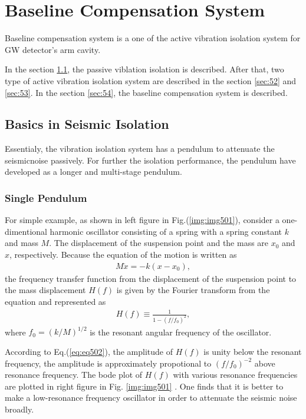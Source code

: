 \chapter{Baseline Compensation System}
Baseline compensation system is a one of the active vibration isolation system for GW detector's arm cavity. 

In the section \cref{sec:51}, the passive viblation isolation is described. After that, two type of active vibration isolation system are described in the section \cref{sec:52} and \cref{sec:53}. In the section \cref{sec:54}, the baseline compensation system is described.

\section{Basics in Seismic Isolation}\label{sec:51}
Essentialy, the vibration isolation system has a pendulum to attenuate the seismicnoise passively. For further the isolation performance, the pendulum have developed as a longer and multi-stage pendulum.

\subsection{Single Pendulum}
For simple example, as shown in left figure in Fig.(\ref{img:img501}), consider a one-dimentional harmonic oscillator consisting of a spring with a spring constant $k$ and mass $M$. The displacement of the suspension point and the mass are $x_0$ and $x$, respectively. Because the equation of the motion is written as
\begin{eqnarray} \label{eq:eq501}
  M\ddot{x} = -k(x-x_0),
\end{eqnarray}
the frequency transfer function from the displacement of the suspension point to the mass displacement $H(f)$ is given by the Fourier transform from the equation and represented as
\begin{eqnarray} \label{eq:eq502}
  H(f) \equiv \frac{1}{1-(f/f_0)^2},
\end{eqnarray}
where $f_0 = (k/M)^{1/2}$ is the resonant angular frequency of the oscillator.

According to Eq.(\ref{eq:eq502}), the amplitude of $H(f)$ is unity below the resonant frequency, the amplitude is approximately propotional to $(f/f_0)^{-2}$ above resonance frequency. The bode plot of $H(f)$ with various resonance frequencies are plotted in right figure in Fig. \ref{img:img501} . One finds that it is better to make a low-resonance frequency oscillator in order to attenuate the seismic noise broadly. 

